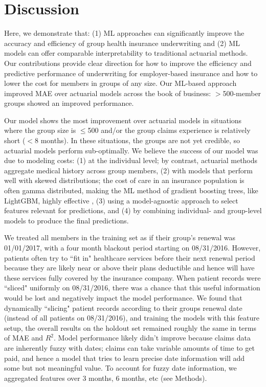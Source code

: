 \documentclass[letterpaper]{article} %
\begin{document}
\section*{Discussion}
Here, we demonstrate that: (1) ML approaches can significantly improve the accuracy and efficiency of group health insurance underwriting and (2) ML models can offer comparable interpretability to traditional actuarial methods. Our contributions provide clear direction for how to improve the efficiency and predictive performance of underwriting for employer-based insurance and how to lower the cost for members in groups of any size. Our ML-based approach improved MAE over actuarial models across the book of business: $>$500-member groups showed an improved performance.

Our model shows the most improvement over actuarial models in situations where the group size is $\leq$500 and/or the group claims experience is relatively short ($<$8 months).  In these situations, the groups are not yet credible, so actuarial models perform sub-optimally. We believe the success of our model was due to modeling costs: (1) at the individual level; by contrast, actuarial methods aggregate medical history across group members, (2) with models that perform well with skewed distributions; the cost of care in an insurance population is often gamma distributed, making the ML method of gradient boosting trees, like LightGBM, highly effective \cite{gradboost}, (3) using a model-agnostic approach to select features relevant for predictions, and (4) by combining individual- and group-level models to produce the final predictions.

We treated all members in the training set as if their group's renewal was 01/01/2017, with a four month blackout period starting on 08/31/2016. However, patients often try to ``fit in" healthcare services before their next renewal period because they are likely near or above their plans deductible and hence will have these services fully covered by the insurance company. When patient records were ``sliced" uniformly on 08/31/2016, there was a chance that this useful information would be lost and negatively impact the model performance. We found that dynamically ``slicing" patient records according to their groups renewal date (instead of all patients on 08/31/2016), and training the models with this feature setup, the overall results on the holdout set remained roughly the same in terms of MAE and $R^2$. Model performance likely didn't improve because claims data are inherently fuzzy with dates; claims can take variable amounts of time to get paid, and hence a model that tries to learn precise date information will add some but not meaningful value. To account for fuzzy date information, we aggregated features over 3 months, 6 months, etc (see Methods).
\end{document}
